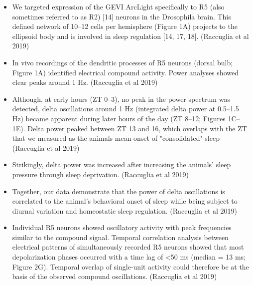 \documentclass[11pt]{article}
\begin{document}
\begin{itemize}
    \item We targeted expression of the GEVI ArcLight specifically to R5 (also sometimes referred to as R2) [14] neurons in the Drosophila brain. This defined network of 10–12 cells per hemisphere (Figure 1A) projects to the ellipsoid body and is involved in sleep regulation [14, 17, 18].
    \parencite{raccugliaNetworkSpecificSynchronizationElectrical2019} (Raccuglia et al 2019)

    \item In vivo recordings of the dendritic processes of R5 neurons (dorsal bulb; Figure 1A) identified electrical compound activity. Power analyses showed clear peaks around 1 Hz.
    \parencite{raccugliaNetworkSpecificSynchronizationElectrical2019} (Raccuglia et al 2019)

    \item Although, at early hours (ZT 0–3), no peak in the power spectrum was detected, delta oscillations around 1 Hz (integrated delta power at 0.5–1.5 Hz) became apparent during later hours of the day (ZT 8–12; Figures 1C–1E). Delta power peaked between ZT 13 and 16, which overlaps with the ZT that we measured as the animals mean onset of "consolidated" sleep
    \parencite{raccugliaNetworkSpecificSynchronizationElectrical2019} (Raccuglia et al 2019)

    \item Strikingly, delta power was increased after increasing the animals’ sleep pressure through sleep deprivation.
    \parencite{raccugliaNetworkSpecificSynchronizationElectrical2019} (Raccuglia et al 2019)

    \item Together, our data demonstrate that the power of delta oscillations is correlated to the animal’s behavioral onset of sleep while being subject to diurnal variation and homeostatic sleep regulation.
    \parencite{raccugliaNetworkSpecificSynchronizationElectrical2019} (Raccuglia et al 2019)

    \item Individual R5 neurons showed oscillatory activity with peak frequencies similar to the compound signal.
    Temporal correlation analysis between electrical patterns of simultaneously recorded R5 neurons showed that most depolarization phases occurred with a time lag of <50 ms (median = 13 ms; Figure 2G). Temporal overlap of single-unit activity could therefore be at the basis of the observed compound oscillations.
    \parencite{raccugliaNetworkSpecificSynchronizationElectrical2019} (Raccuglia et al 2019)


\end{itemize}
\end{document}
